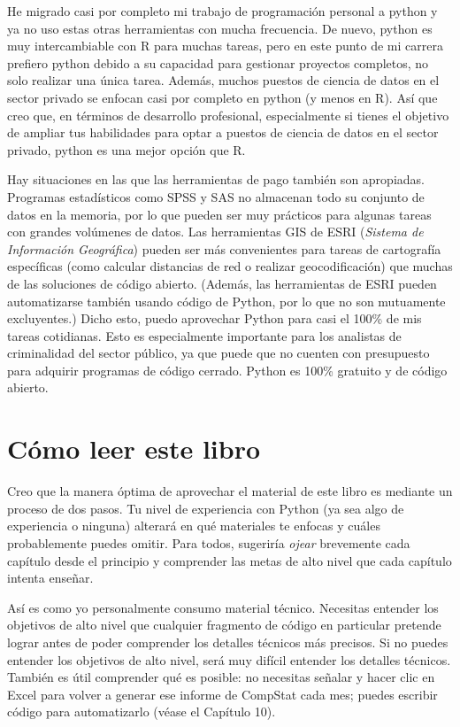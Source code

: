 \documentclass[
  letterpaper,
]{scrbook}
\begin{document}
He migrado casi por completo mi trabajo de programación personal a
python y ya no uso estas otras herramientas con mucha frecuencia. De
nuevo, python es muy intercambiable con R para muchas tareas, pero en
este punto de mi carrera prefiero python debido a su capacidad para
gestionar proyectos completos, no solo realizar una única tarea. Además,
muchos puestos de ciencia de datos en el sector privado se enfocan casi
por completo en python (y menos en R). Así que creo que, en términos de
desarrollo profesional, especialmente si tienes el objetivo de ampliar
tus habilidades para optar a puestos de ciencia de datos en el sector
privado, python es una mejor opción que R.

Hay situaciones en las que las herramientas de pago también son
apropiadas. Programas estadísticos como SPSS y SAS no almacenan todo su
conjunto de datos en la memoria, por lo que pueden ser muy prácticos
para algunas tareas con grandes volúmenes de datos. Las herramientas GIS
de ESRI (\emph{Sistema de Información Geográfica}) pueden ser más
convenientes para tareas de cartografía específicas (como calcular
distancias de red o realizar geocodificación) que muchas de las
soluciones de código abierto. (Además, las herramientas de ESRI pueden
automatizarse también usando código de Python, por lo que no son
mutuamente excluyentes.) Dicho esto, puedo aprovechar Python para casi
el 100\% de mis tareas cotidianas. Esto es especialmente importante para
los analistas de criminalidad del sector público, ya que puede que no
cuenten con presupuesto para adquirir programas de código cerrado.
Python es 100\% gratuito y de código abierto.

\section*{Cómo leer este libro}\label{cuxf3mo-leer-este-libro}


Creo que la manera óptima de aprovechar el material de este libro es
mediante un proceso de dos pasos. Tu nivel de experiencia con Python (ya
sea algo de experiencia o ninguna) alterará en qué materiales te enfocas
y cuáles probablemente puedes omitir. Para todos, sugeriría \emph{ojear}
brevemente cada capítulo desde el principio y comprender las metas de
alto nivel que cada capítulo intenta enseñar.

Así es como yo personalmente consumo material técnico. Necesitas
entender los objetivos de alto nivel que cualquier fragmento de código
en particular pretende lograr antes de poder comprender los detalles
técnicos más precisos. Si no puedes entender los objetivos de alto
nivel, será muy difícil entender los detalles técnicos. También es útil
comprender qué es posible: no necesitas señalar y hacer clic en Excel
para volver a generar ese informe de CompStat cada mes; puedes escribir
código para automatizarlo (véase el Capítulo 10).
\end{document}
